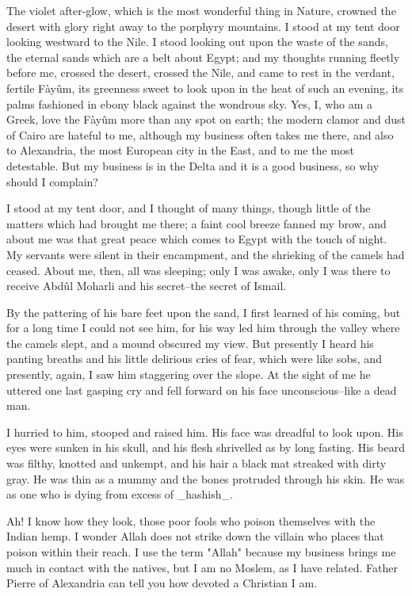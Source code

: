 The violet after-glow, which is the most wonderful thing in Nature,
crowned the desert with glory right away to the porphyry mountains.
I stood at my tent door looking westward to the Nile. I stood looking
out upon the waste of the sands, the eternal sands which are a belt
about Egypt; and my thoughts running fleetly before me, crossed the
desert, crossed the Nile, and came to rest in the verdant, fertile
Fàyûm, its greenness sweet to look upon in the heat of such an
evening, its palms fashioned in ebony black against the wondrous sky.
Yes, I, who am a Greek, love the Fàyûm more than any spot on earth;
the modern clamor and dust of Cairo are hateful to me, although my
business often takes me there, and also to Alexandria, the most
European city in the East, and to me the most detestable. But my
business is in the Delta and it is a good business, so why should
I complain?

I stood at my tent door, and I thought of many things, though little
of the matters which had brought me there; a faint cool breeze fanned
my brow, and about me was that great peace which comes to Egypt with
the touch of night. My servants were silent in their encampment, and
the shrieking of the camels had ceased. About me, then, all was
sleeping; only I was awake, only I was there to receive Abdûl Moharli
and his secret--the secret of Ismail.

By the pattering of his bare feet upon the sand, I first learned of
his coming, but for a long time I could not see him, for his way led
him through the valley where the camels slept, and a mound obscured
my view. But presently I heard his panting breaths and his little
delirious cries of fear, which were like sobs, and presently, again,
I saw him staggering over the slope. At the sight of me he uttered one
last gasping cry and fell forward on his face unconscious--like a dead
man.

I hurried to him, stooped and raised him. His face was dreadful to
look upon. His eyes were sunken in his skull, and his flesh shrivelled
as by long fasting. His beard was filthy, knotted and unkempt, and his
hair a black mat streaked with dirty gray. He was thin as a mummy and
the bones protruded through his skin. He was as one who is dying from
excess of _hashish_.

Ah! I know how they look, those poor fools who poison themselves with
the Indian hemp. I wonder Allah does not strike down the villain who
places that poison within their reach. I use the term "Allah" because
my business brings me much in contact with the natives, but I am no
Moslem, as I have related. Father Pierre of Alexandria can tell you
how devoted a Christian I am.

